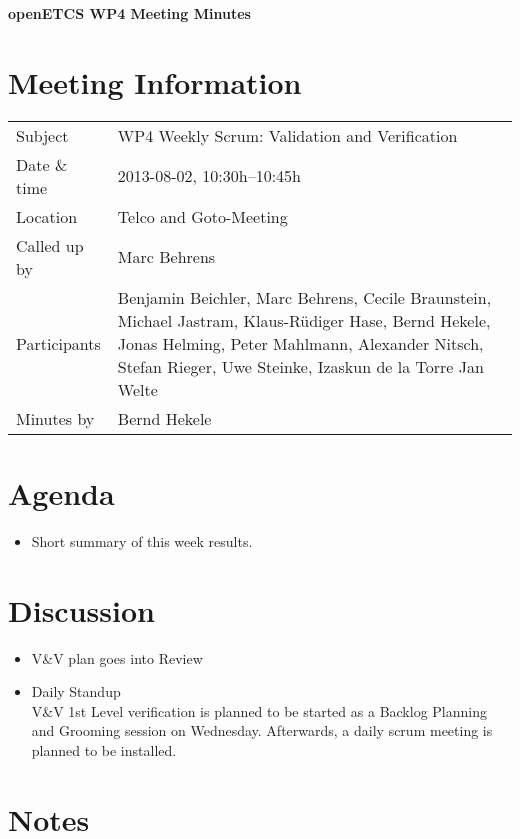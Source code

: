 \documentclass[a4paper, 11pt]{article}
\begin{document}
{\begin{center}\huge\bf openETCS WP4 Meeting Minutes\end{center}}
\section{Meeting Information}

\renewcommand{\arraystretch}{1.5}
\begin{supertabular}{m{.2\textwidth}m{.8\textwidth}}
Subject & WP4 Weekly Scrum: Validation and Verification\\
Date \& time & 2013-08-02, 10:30h--10:45h\\
Location & Telco and Goto-Meeting\\
Called up by & Marc Behrens\\
Participants &
Benjamin Beichler,
Marc Behrens,
Cecile Braunstein,
Michael Jastram,
Klaus-R\"udiger Hase,
Bernd Hekele,
Jonas Helming,
Peter Mahlmann,
Alexander Nitsch,
Stefan Rieger,
Uwe Steinke,
Izaskun de la Torre
Jan Welte
\\

Minutes by & Bernd Hekele\\

\end{supertabular}
\renewcommand{\arraystretch}{1.0}


\section{{Agenda}}
\begin{itemize}
\item Short summary of this week results.
\end{itemize}

\section{Discussion}

\begin{itemize}
\item V\&V plan goes into Review
\item Daily Standup\\
V\&V 1st Level verification is planned to be started as a Backlog Planning and Grooming session on Wednesday. Afterwards, a daily scrum meeting is planned to be installed.
\end{itemize}


\section{Notes}
\end{document}
